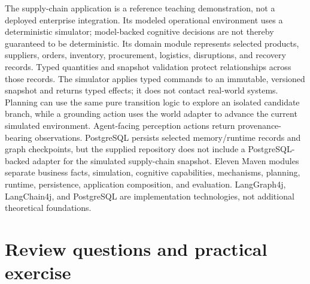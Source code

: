 \begin{chapterrecap}
The supply-chain application is a reference teaching demonstration, not a deployed enterprise integration. Its modeled operational environment uses a deterministic simulator; model-backed cognitive decisions are not thereby guaranteed to be deterministic. Its domain module represents selected products, suppliers, orders, inventory, procurement, logistics, disruptions, and recovery records. Typed quantities and snapshot validation protect relationships across those records. The simulator applies typed commands to an immutable, versioned snapshot and returns typed effects; it does not contact real-world systems. Planning can use the same pure transition logic to explore an isolated candidate branch, while a grounding action uses the world adapter to advance the current simulated environment. Agent-facing perception actions return provenance-bearing observations. PostgreSQL persists selected memory/runtime records and graph checkpoints, but the supplied repository does not include a PostgreSQL-backed adapter for the simulated supply-chain snapshot. Eleven Maven modules separate business facts, simulation, cognitive capabilities, mechanisms, planning, runtime, persistence, application composition, and evaluation. LangGraph4j, LangChain4j, and PostgreSQL are implementation technologies, not additional theoretical foundations.
\end{chapterrecap}

\section{Review questions and practical exercise}
\label{sec:ch19-review-questions}

